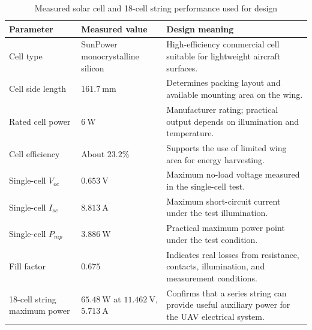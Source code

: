 \begin{table}[htbp]
    \centering
    \caption{Measured solar cell and 18-cell string performance used for design}
    \label{tab:solar-measured-data}
    \begin{tabular}{p{} p{} p{}}
        \toprule
        Parameter & Measured value & Design meaning \\
        \midrule
        Cell type &
        SunPower monocrystalline silicon &
        High-efficiency commercial cell suitable for lightweight aircraft surfaces. \\
        Cell side length &
        \(161.7~\mathrm{mm}\) &
        Determines packing layout and available mounting area on the wing. \\
        Rated cell power &
        \(6~\mathrm{W}\) &
        Manufacturer rating; practical output depends on illumination and temperature. \\
        Cell efficiency &
        About \(23.2\%\) &
        Supports the use of limited wing area for energy harvesting. \\
        Single-cell \(V_{oc}\) &
        \(0.653~\mathrm{V}\) &
        Maximum no-load voltage measured in the single-cell test. \\
        Single-cell \(I_{sc}\) &
        \(8.813~\mathrm{A}\) &
        Maximum short-circuit current under the test illumination. \\
        Single-cell \(P_{mp}\) &
        \(3.886~\mathrm{W}\) &
        Practical maximum power point under the test condition. \\
        Fill factor &
        \(0.675\) &
        Indicates real losses from resistance, contacts, illumination, and measurement conditions. \\
        18-cell string maximum power &
        \(65.48~\mathrm{W}\) at \(11.462~\mathrm{V}\), \(5.713~\mathrm{A}\) &
        Confirms that a series string can provide useful auxiliary power for the UAV electrical system. \\
        \bottomrule
    \end{tabular}
\end{table}

